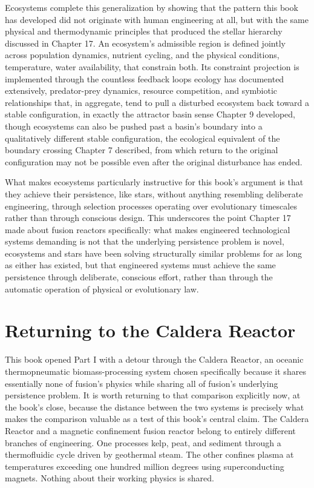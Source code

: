 Ecosystems complete this generalization by showing that the pattern this book has developed did not originate with human engineering at all, but with the same physical and thermodynamic principles that produced the stellar hierarchy discussed in Chapter 17. An ecosystem's admissible region is defined jointly across population dynamics, nutrient cycling, and the physical conditions, temperature, water availability, that constrain both. Its constraint projection is implemented through the countless feedback loops ecology has documented extensively, predator-prey dynamics, resource competition, and symbiotic relationships that, in aggregate, tend to pull a disturbed ecosystem back toward a stable configuration, in exactly the attractor basin sense Chapter 9 developed, though ecosystems can also be pushed past a basin's boundary into a qualitatively different stable configuration, the ecological equivalent of the boundary crossing Chapter 7 described, from which return to the original configuration may not be possible even after the original disturbance has ended.

What makes ecosystems particularly instructive for this book's argument is that they achieve their persistence, like stars, without anything resembling deliberate engineering, through selection processes operating over evolutionary timescales rather than through conscious design. This underscores the point Chapter 17 made about fusion reactors specifically: what makes engineered technological systems demanding is not that the underlying persistence problem is novel, ecosystems and stars have been solving structurally similar problems for as long as either has existed, but that engineered systems must achieve the same persistence through deliberate, conscious effort, rather than through the automatic operation of physical or evolutionary law.

\section{Returning to the Caldera Reactor}

This book opened Part I with a detour through the Caldera Reactor, an oceanic thermopneumatic biomass-processing system chosen specifically because it shares essentially none of fusion's physics while sharing all of fusion's underlying persistence problem. It is worth returning to that comparison explicitly now, at the book's close, because the distance between the two systems is precisely what makes the comparison valuable as a test of this book's central claim. The Caldera Reactor and a magnetic confinement fusion reactor belong to entirely different branches of engineering. One processes kelp, peat, and sediment through a thermofluidic cycle driven by geothermal steam. The other confines plasma at temperatures exceeding one hundred million degrees using superconducting magnets. Nothing about their working physics is shared.

